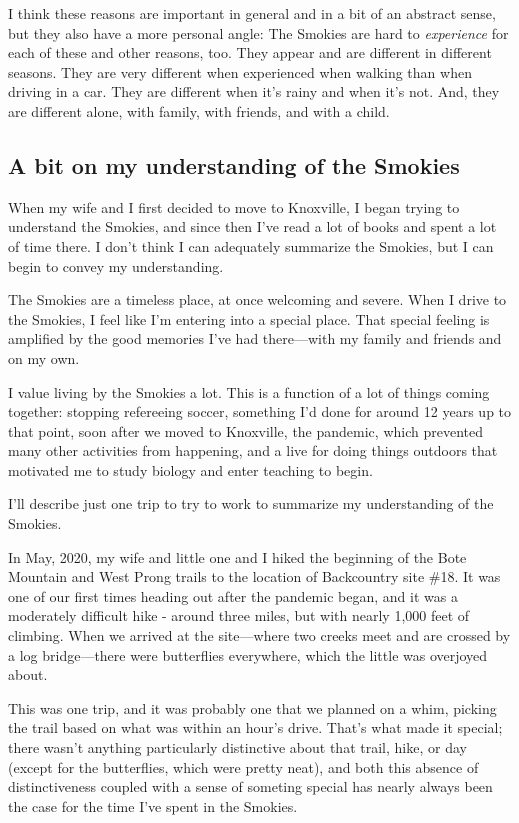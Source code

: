 \documentclass[
]{book}
\begin{document}
I think these reasons are important in general and in a bit of an abstract sense, but they also have a more personal angle: The Smokies are hard to \emph{experience} for each of these and other reasons, too. They appear and are different in different seasons. They are very different when experienced when walking than when driving in a car. They are different when it's rainy and when it's not. And, they are different alone, with family, with friends, and with a child.

\hypertarget{a-bit-on-my-understanding-of-the-smokies}{%
\subsection{A bit on my understanding of the Smokies}\label{a-bit-on-my-understanding-of-the-smokies}}

When my wife and I first decided to move to Knoxville, I began trying to understand the Smokies, and since then I've read a lot of books and spent a lot of time there. I don't think I can adequately summarize the Smokies, but I can begin to convey my understanding.

The Smokies are a timeless place, at once welcoming and severe. When I drive to the Smokies, I feel like I'm entering into a special place. That special feeling is amplified by the good memories I've had there---with my family and friends and on my own.

I value living by the Smokies a lot. This is a function of a lot of things coming together: stopping refereeing soccer, something I'd done for around 12 years up to that point, soon after we moved to Knoxville, the pandemic, which prevented many other activities from happening, and a live for doing things outdoors that motivated me to study biology and enter teaching to begin.

I'll describe just one trip to try to work to summarize my understanding of the Smokies.

In May, 2020, my wife and little one and I hiked the beginning of the Bote Mountain and West Prong trails to the location of Backcountry site \#18. It was one of our first times heading out after the pandemic began, and it was a moderately difficult hike - around three miles, but with nearly 1,000 feet of climbing. When we arrived at the site---where two creeks meet and are crossed by a log bridge---there were butterflies everywhere, which the little was overjoyed about.

This was one trip, and it was probably one that we planned on a whim, picking the trail based on what was within an hour's drive. That's what made it special; there wasn't anything particularly distinctive about that trail, hike, or day (except for the butterflies, which were pretty neat), and both this absence of distinctiveness coupled with a sense of someting special has nearly always been the case for the time I've spent in the Smokies.
\end{document}
